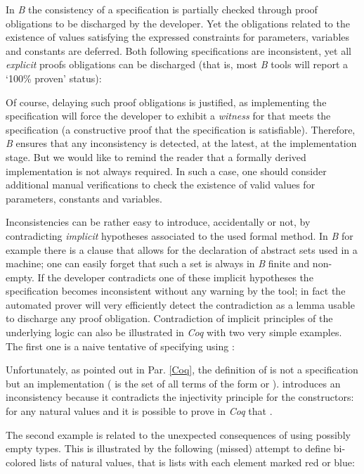 \documentclass[conference]{IEEEtran}
\begin{document}
In \emph{B} the consistency of a specification is partially checked through proof obligations
to be discharged by the developer. Yet the obligations related to the existence of values
satisfying the expressed constraints for parameters, variables and constants are deferred.
Both following specifications are inconsistent, yet all \emph{explicit} proofs obligations can
be discharged (that is, most \emph{B} tools will report a `100\% proven' status):

Of course, delaying such proof obligations is justified, as implementing the specification
will force the developer to exhibit a \emph{witness} for {\small} that meets the
specification (a constructive proof that the specification is satisfiable). Therefore,
\emph{B} ensures that any inconsistency is detected, at the latest, at the implementation
stage. But we would like to remind the reader that a formally derived implementation is not
always required. In such a case, one should consider additional manual verifications to check
the existence of valid values for parameters, constants and variables.

Inconsistencies can be rather easy to introduce, accidentally or not, by contradicting
\emph{implicit} hypotheses associated to the used formal method. In \emph{B} for example there
is a clause {\small} that allows for the declaration of abstract sets used in a
machine; one can easily forget that such a set is always in \emph{B} finite and non-empty. If
the developer contradicts one of these implicit hypotheses the specification becomes
inconsistent without any warning by the tool; in fact the automated prover will very
efficiently detect the contradiction as a lemma usable to discharge any proof obligation.
Contradiction of implicit principles of the underlying logic can also be illustrated in
\emph{Coq} with two very simple examples. The first one is a naive tentative of specifying
{\small} using {\small}:

Unfortunately, as pointed out in Par. \ref{Coq}, the definition of {\small} is not a
specification but an implementation ({\small} is the set of all terms of the form
{\small} or {\small}). {\small}
introduces an inconsistency because it contradicts the injectivity principle for the
constructors: for any natural values {\small} and {\small} it is possible to prove in
\emph{Coq} that {\small}.

The second example is related to the unexpected consequences of using possibly empty types.
This is illustrated by the following (missed) attempt to define bi-colored lists of natural
values, that is lists with each element marked red or blue:
\end{document}
